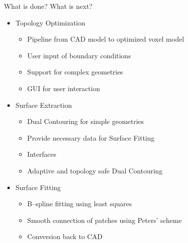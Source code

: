 
\begin{frame}{What is done? What is next?}
\begin{itemize}

\item<+-> Topology Optimization
\begin{itemize}
	\item[\textcolor{green}{\Checkmark}] Pipeline from CAD model to optimized voxel model
	\item[\textcolor{green}{\Checkmark}] User input of boundary conditions
	\item[\textcolor{black}{\VarClock}] Support for complex geometries
	\item[\textcolor{red}{\XSolidBrush}] GUI for user interaction
\end{itemize}

\item<+-> Surface Extraction
\begin{itemize}
	\item[\textcolor{green}{\Checkmark}] Dual Contouring for simple geometries
	\item[\textcolor{green}{\Checkmark}] Provide necessary data for Surface Fitting
	\item[\textcolor{black}{\VarClock}] Interfaces
	\item[\textcolor{red}{\XSolidBrush}] Adaptive and topology safe Dual Contouring
\end{itemize}

\item<+-> Surface Fitting
\begin{itemize}
	\item[\textcolor{green}{\Checkmark}] B--spline fitting using least squares
	\item[\textcolor{green}{\Checkmark}] Smooth connection of patches using Peters' scheme
	\item[\textcolor{red}{\XSolidBrush}] Conversion back to CAD
\end{itemize}
\end{itemize}
\end{frame}
